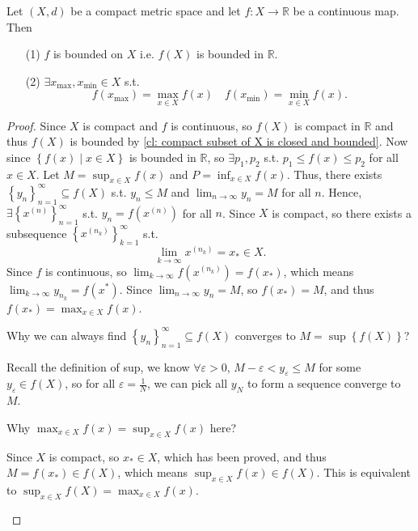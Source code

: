 \begin{proposition}
    Let \((X, d)\) be a compact metric space and let \(f: X \to \mathbb{R} \) be a continuous map. Then 
    \begin{itemize}
        \item [(1)] \(f\) is bounded on \(X\) i.e. \(f(X)\) is bounded in \(\mathbb{R} \).  
        \item [(2)] \(\exists x_{\text{max}}, x_{\text{min}} \in X\) s.t. 
        \[
            f \left( x_{\text{max}} \right) = \max _{x \in X} f(x) \quad f \left( x_{\text{min}} \right) = \min _{x \in X} f(x). 
        \]
    \end{itemize}  
\end{proposition}

\begin{proof}
    Since \(X\) is compact and \(f\) is continuous, so \(f(X)\) is compact in \(\mathbb{R} \) and thus \(f(X)\) is bounded by \autoref{cl: compact subset of X is closed and bounded}. Now since \(\left\{ f(x) \mid x \in X \right\} \) is bounded in \(\mathbb{R} \), so \(\exists p_1, p_2\) s.t. \(p_1 \le f(x) \le p_2\) for all \(x \in X\). Let \(M = \sup_{x \in X} f(x)\) and \(P = \inf _{x \in X} f(x)\). Thus, there exists \(\left\{ y_n \right\}_{n=1}^{\infty} \subseteq f(X) \) s.t. \(y_n \le M\) and \(\lim_{n \to \infty} y_n = M \) for all \(n\). Hence, \(\exists \left\{ x^{(n)} \right\}_{n=1}^{\infty}  \) s.t. \(y_n = f \left( x^{(n)} \right) \) for all \(n\). Since \(X\) is compact, so there exists a subsequence \(\left\{ x^{(n_k)} \right\}_{k=1}^{\infty}  \) s.t. 
    \[
        \lim_{k \to \infty} x^{(n_k)} = x_{\ast} \in X. 
    \]  Since \(f\) is continuous, so \(\lim_{k \to \infty} f \left( x^{(n_k)} \right) = f \left( x_{\ast}  \right)   \), which means \(\lim_{k \to \infty} y_{n_k} = f \left( x^* \right)  \). Since \(\lim_{n \to \infty}y_n = M \), so \(f(x_{\ast} ) = M\), and thus \(f \left( x_{\ast}  \right) = \max _{x \in X} f(x) \).   
    
    \begin{question}
        Why we can always find \(\left\{ y_n \right\}_{n=1}^{\infty} \subseteq f(X) \) converges to \(M = \sup \left\{ f(X) \right\} \)?  
    \end{question}    
    \begin{answer}
        Recall the definition of sup, we know \(\forall \varepsilon > 0\), \(M -\varepsilon < y_{\varepsilon } \le M \) for some \(y_{\varepsilon } \in f(X) \), so for all \(\varepsilon = \frac{1}{N}\), we can pick all \(y_N\) to form a sequence converge to \(M\).    
    \end{answer}

    \begin{question}
        Why \(\max _{x \in X} f(x) = \sup_{x \in X} f(x)\) here? 
    \end{question}
    \begin{answer}
        Since \(X\) is compact, so \(x_{\ast}  \in X\), which has been proved, and thus \(M = f(x_{\ast}) \in f(X) \), which means \(\sup _{x \in X}f(x) \in f(X)\). This is equivalent to \(\sup _{x \in X} f(X) = \max _{x \in X}f(x)\).      
    \end{answer}
\end{proof}
